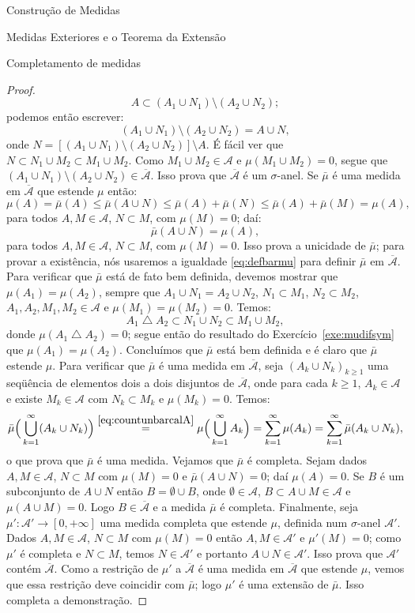 \documentclass[oneside,final,11pt]{amsbook}
\theoremstyle{remark}\newtheorem{exercise}{Exercício}[chapter]
\theoremstyle{remark}\newtheorem{*exercise}[exercise]{\hbox to 0pt{\hskip 0pt minus 1fil*}Exercício}
\theoremstyle{definition}\newtheorem{exdefin}{Definição}[chapter]
\theoremstyle{plain}\newtheorem{teo}{Teorema}[section]
\theoremstyle{plain}\newtheorem{lem}[teo]{Lema}
\theoremstyle{plain}\newtheorem{prop}[teo]{Proposição}
\theoremstyle{plain}\newtheorem{cor}[teo]{Corolário}
\theoremstyle{definition}\newtheorem{defin}[teo]{Definição}
\theoremstyle{remark}\newtheorem{rem}[teo]{Observação}
\theoremstyle{definition}\newtheorem{notation}[teo]{Notação}
\theoremstyle{definition}\newtheorem{convention}[teo]{Convenção}
\theoremstyle{definition}\newtheorem{example}[teo]{Exemplo}
\numberwithin{section}{chapter}
\numberwithin{equation}{section}
\begin{document}
\begin{chapter}{Construção de Medidas}
\begin{section}{Medidas Exteriores e o Teorema da Extensão}
\begin{subsection}{Completamento de medidas}
\begin{proof}
\[A\subset(A_1\cup N_1)\setminus(A_2\cup N_2);\]
podemos então escrever:
\[(A_1\cup N_1)\setminus(A_2\cup N_2)=A\cup N,\]
onde $N=[(A_1\cup N_1)\setminus(A_2\cup N_2)]\setminus A$. É fácil ver que
$N\subset N_1\cup M_2\subset M_1\cup M_2$. Como $M_1\cup M_2\in\mathcal A$
e $\mu(M_1\cup M_2)=0$, segue que $(A_1\cup N_1)\setminus(A_2\cup N_2)\in\overline{\mathcal A}$.
Isso prova que $\overline{\mathcal A}$ é um $\sigma$-anel.
Se $\bar\mu$ é uma medida em $\overline{\mathcal A}$ que estende $\mu$ então:
\[\mu(A)=\bar\mu(A)\le\bar\mu(A\cup N)\le\bar\mu(A)+\bar\mu(N)\le
\bar\mu(A)+\bar\mu(M)=\mu(A),\]
para todos $A,M\in\mathcal A$, $N\subset M$, com $\mu(M)=0$; daí:
\begin{equation}\label{eq:defbarmu}
\bar\mu(A\cup N)=\mu(A),
\end{equation}
para todos $A,M\in\mathcal A$, $N\subset M$, com $\mu(M)=0$. Isso prova a unicidade
de $\bar\mu$; para provar a existência, nós usaremos a igualdade \eqref{eq:defbarmu}
para definir $\bar\mu$ em $\overline{\mathcal A}$. Para verificar que $\bar\mu$ está
de fato bem definida, devemos mostrar que $\mu(A_1)=\mu(A_2)$, sempre que
$A_1\cup N_1=A_2\cup N_2$, $N_1\subset M_1$, $N_2\subset M_2$, $A_1,A_2,M_1,M_2\in\mathcal A$
e $\mu(M_1)=\mu(M_2)=0$. Temos:
\[A_1\bigtriangleup A_2\subset N_1\cup N_2\subset M_1\cup M_2,\]
donde $\mu(A_1\bigtriangleup A_2)=0$; segue então do resultado do Exercício~\ref{exe:mudifsym}
que $\mu(A_1)=\mu(A_2)$. Concluímos que $\bar\mu$ está bem definida e é claro que $\bar\mu$
estende $\mu$. Para verificar que $\bar\mu$ é uma medida em $\overline{\mathcal A}$, seja
$(A_k\cup N_k)_{k\ge1}$ uma seqüência de elementos dois a dois disjuntos
de $\overline{\mathcal A}$, onde para cada $k\ge1$,
$A_k\in\mathcal A$ e existe $M_k\in\mathcal A$ com $N_k\subset M_k$ e $\mu(M_k)=0$. Temos:
\[\bar\mu\Big(\bigcup_{k=1}^\infty(A_k\cup N_k)\Big)\stackrel{\eqref{eq:countunbarcalA}}=
\mu\Big(\bigcup_{k=1}^\infty A_k\Big)=\sum_{k=1}^\infty\mu(A_k)=\sum_{k=1}^\infty\bar\mu(A_k\cup N_k),\]
o que prova que $\bar\mu$ é uma medida. Vejamos que $\bar\mu$ é completa. Sejam dados
$A,M\in\mathcal A$, $N\subset M$ com $\mu(M)=0$ e $\bar\mu(A\cup N)=0$; daí
$\mu(A)=0$. Se $B$ é um subconjunto de $A\cup N$ então $B=\emptyset\cup B$, onde $\emptyset\in\mathcal A$,
$B\subset A\cup M\in\mathcal A$ e $\mu(A\cup M)=0$. Logo $B\in\overline{\mathcal A}$
e a medida $\bar\mu$ é completa.
Finalmente, seja $\mu':\mathcal A'\to[0,+\infty]$ uma medida completa que estende $\mu$,
definida num $\sigma$-anel $\mathcal A'$. Dados $A,M\in\mathcal A$, $N\subset M$ com $\mu(M)=0$
então $A,M\in\mathcal A'$ e $\mu'(M)=0$; como $\mu'$ é completa e $N\subset M$, temos
$N\in\mathcal A'$ e portanto $A\cup N\in\mathcal A'$. Isso prova que $\mathcal A'$ contém
$\overline{\mathcal A}$. Como a restrição de $\mu'$ a $\overline{\mathcal A}$ é uma medida
em $\overline{\mathcal A}$ que estende $\mu$, vemos que essa restrição deve coincidir
com $\bar\mu$; logo $\mu'$ é uma extensão de $\bar\mu$. Isso completa a demonstração.
\end{proof}


\end{subsection}
\end{section}
\end{chapter}
\end{document}
